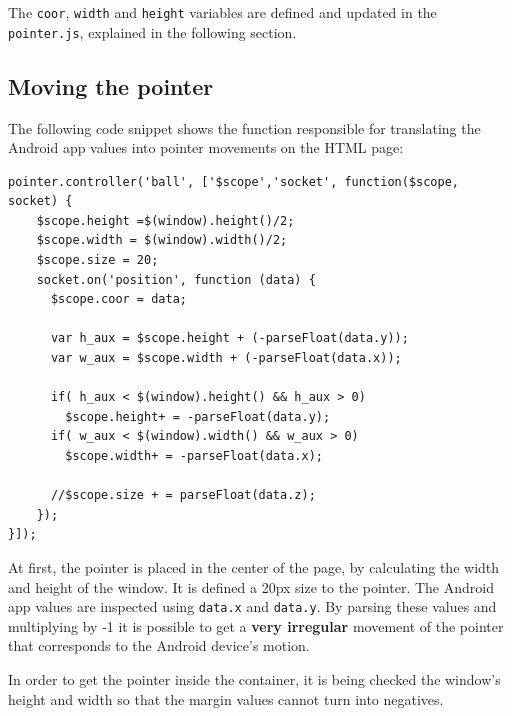 \documentclass{llncs}
\begin{document}
The \texttt{coor}, \texttt{width} and \texttt{height} variables are defined and updated in the \texttt{pointer.js}, explained in the following section.

\subsection{Moving the pointer}

The following code snippet shows the function responsible for translating the Android app values into pointer movements on the HTML page:

\begin{lstlisting}
pointer.controller('ball', ['$scope','socket', function($scope, socket) {
    $scope.height =$(window).height()/2;
    $scope.width = $(window).width()/2;
    $scope.size = 20;
    socket.on('position', function (data) {
      $scope.coor = data;

      var h_aux = $scope.height + (-parseFloat(data.y));
      var w_aux = $scope.width + (-parseFloat(data.x));

      if( h_aux < $(window).height() && h_aux > 0)
        $scope.height+ = -parseFloat(data.y);
      if( w_aux < $(window).width() && w_aux > 0)
        $scope.width+ = -parseFloat(data.x);

      //$scope.size + = parseFloat(data.z);
    });
}]);
\end{lstlisting}

At first, the pointer is placed in the center of the page, by calculating the width and height of the window. It is defined a 20px size to the pointer. The Android app values are inspected using \texttt{data.x} and \texttt{data.y}. By parsing these values and multiplying by -1 it is possible to get a \textbf{very irregular} movement of the pointer that corresponds to the Android device's motion.

In order to get the pointer inside the container, it is being checked the window's height and width so that the margin values cannot turn into negatives.
\end{document}
